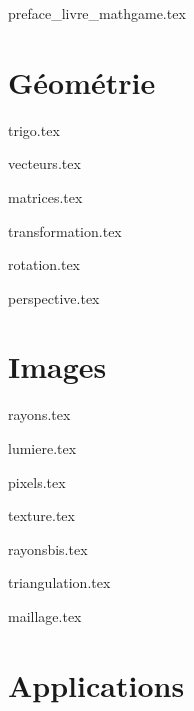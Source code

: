 \documentclass[10pt,twoside,openright]{report}
\begin{document}
\renewcommand{\contentsname}{Sommaire}

{preface_livre_mathgame.tex}
\debutchapitres
{}


\clearemptydoublepage


\part{Géométrie}

{trigo.tex}

{vecteurs.tex}

{matrices.tex}

{transformation.tex}

{rotation.tex}

{perspective.tex}


\clearemptydoublepage
\part{Images}

{rayons.tex}

{lumiere.tex}

{pixels.tex}

{texture.tex}

{rayonsbis.tex}

{triangulation.tex}

{maillage.tex}


\clearemptydoublepage
\part{Applications}
\end{document}
